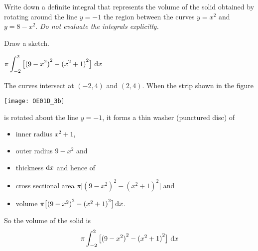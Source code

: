 \begin{question}[2001D] %
Write down a definite integral that represents the volume of the solid
obtained by rotating  around the line $y=-1$ the region between the
curves $y=x^2$ and $y=8-x^2$.
\emph{Do not evaluate the integrals explicitly.}
\end{question}

\begin{hint}
Draw a sketch.
\end{hint}

\begin{answer}
$\pi\displaystyle\int_{-2}^{2}\big[{(9-x^2)}^2-{(x^2+1)}^2\big]\ \dee{x}$
\end{answer}

\begin{solution}
The curves intersect at $(-2,4)$ and $(2,4)$. When the strip
shown in the figure
\begin{center}
       \texttt{[image: OE01D\_3b]}
\end{center}

\noindent
is rotated about the line $y=-1$, it forms
a thin washer (punctured disc) of
\begin{itemize}
\item
inner radius $x^2+1$,
\item
outer radius $9-x^2$  and
\item thickness $\mathrm{d}x$ and hence of
\item
cross sectional area $\pi\big[{(9-x^2)}^2-{(x^2+1)}^2\big]$ and
\item
volume $\pi\big[{(9-x^2)}^2-{(x^2+1)}^2\big]\,\mathrm{d}x$.
\end{itemize}

\noindent So the volume of the solid is
\begin{align*}
\pi\int_{-2}^{2}\big[{(9-x^2)}^2-{(x^2+1)}^2\big]\ \mathrm{d}x
\end{align*}
\end{solution}


